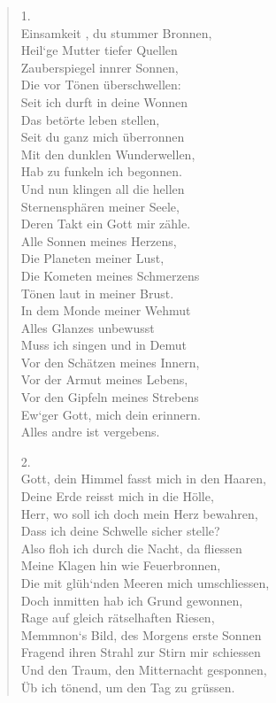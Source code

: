 \documentclass[10pt,a5paper]{book}
\begin{document}
\begin{verse}
1.\\
Einsamkeit , du stummer Bronnen,\\
Heil`ge Mutter  tiefer Quellen\\
Zauberspiegel innrer Sonnen, \\
Die vor Tönen überschwellen:\\
Seit ich durft in deine Wonnen\\
Das betörte leben stellen,\\
Seit du ganz mich überronnen\\
Mit den dunklen Wunderwellen,\\
Hab zu funkeln ich begonnen.\\
Und nun klingen all die hellen\\
Sternensphären meiner Seele,\\
Deren Takt ein Gott mir zähle.\\
Alle Sonnen meines Herzens,\\
Die Planeten meiner Lust,\\
Die Kometen meines Schmerzens\\
Tönen laut in meiner Brust.\\
In dem Monde meiner Wehmut\\
Alles Glanzes unbewusst\\
Muss ich singen und in Demut\\
Vor den Schätzen meines Innern,\\
Vor der Armut meines Lebens,\\
Vor den Gipfeln meines Strebens\\
Ew`ger Gott, mich dein erinnern.\\
Alles andre ist vergebens.

2.\\
Gott, dein Himmel fasst mich in den Haaren,\\
Deine Erde reisst mich in die Hölle,\\
Herr, wo soll ich doch mein Herz bewahren,\\
Dass ich deine Schwelle sicher stelle?\\
Also floh ich durch die Nacht, da fliessen\\
Meine Klagen hin wie Feuerbronnen,\\
Die mit glüh`nden Meeren mich umschliessen,\\
Doch inmitten hab ich Grund gewonnen,\\
Rage auf gleich rätselhaften Riesen,\\
Memmnon`s Bild, des Morgens erste Sonnen\\
Fragend ihren Strahl zur Stirn mir schiessen\\
Und den Traum, den Mitternacht gesponnen,\\
Üb ich tönend, um den Tag zu grüssen.


\end{verse}
\end{document}

